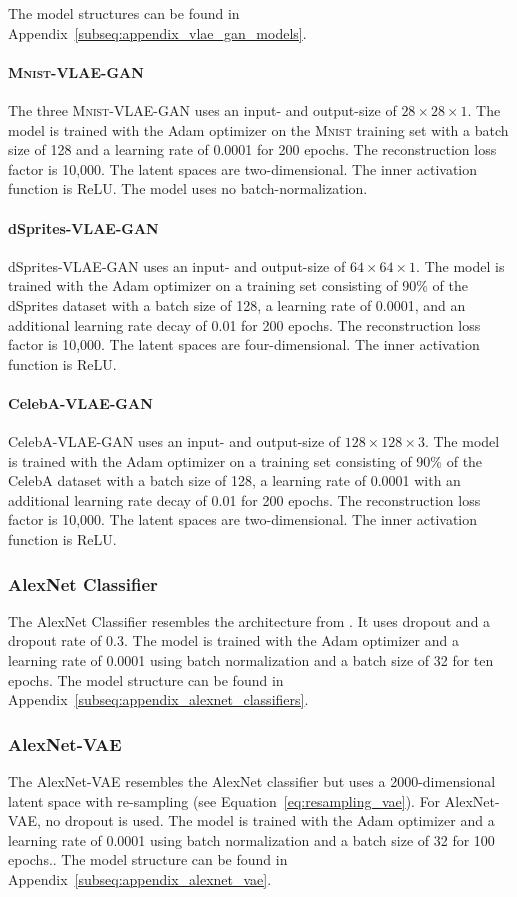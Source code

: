 The model structures can be found in Appendix~\ref{subseq:appendix_vlae_gan_models}.

\paragraph{\textsc{Mnist}-\ac{VLAE}-\ac{GAN}} The three \textsc{Mnist}-\ac{VLAE}-\ac{GAN} uses an input- and output-size of $28\times 28\times 1$.
The model is trained with the Adam optimizer on the \textsc{Mnist} training set with a batch size of 128 and a learning rate of 0.0001 for 200 epochs.
The reconstruction loss factor is 10,000.
The latent spaces are two-dimensional.
The inner activation function is ReLU.
The model uses no batch-normalization.

\paragraph{dSprites-\ac{VLAE}-\ac{GAN}} dSprites-\ac{VLAE}-\ac{GAN} uses an input- and output-size of $64\times 64\times 1$.
The model is trained with the Adam optimizer on a training set consisting of 90\% of the dSprites dataset with a batch size of 128, a learning rate of 0.0001, and an additional learning rate decay of 0.01 for 200 epochs.
The reconstruction loss factor is 10,000.
The latent spaces are four-dimensional.
The inner activation function is ReLU.

\paragraph{CelebA-\ac{VLAE}-\ac{GAN}} CelebA-\ac{VLAE}-\ac{GAN} uses an input- and output-size of $128\times 128\times 3$.
The model is trained with the Adam optimizer on a training set consisting of 90\% of the CelebA dataset with a batch size of 128, a learning rate of 0.0001 with an additional learning rate decay of 0.01 for 200 epochs.
The reconstruction loss factor is 10,000.
The latent spaces are two-dimensional.
The inner activation function is ReLU.

\subsubsection{AlexNet Classifier}\label{subsubsec:alexnet_classifier}
The AlexNet Classifier resembles the architecture from \citet{krizhevsky2012imagenet}.
It uses dropout and a dropout rate of 0.3.
The model is trained with the Adam optimizer and a learning rate of 0.0001 using batch normalization and a batch size of 32 for ten epochs.
The model structure can be found in Appendix~\ref{subseq:appendix_alexnet_classifiers}.

\subsubsection{AlexNet-VAE}\label{subsubsec:alexnet_vae}
The AlexNet-\ac{VAE} resembles the AlexNet classifier but uses a 2000-dimensional latent space with re-sampling (see Equation~\ref{eq:resampling_vae}).
For AlexNet-\ac{VAE}, no dropout is used.
The model is trained with the Adam optimizer and a learning rate of 0.0001 using batch normalization and a batch size of 32 for 100 epochs..
The model structure can be found in Appendix~\ref{subseq:appendix_alexnet_vae}.